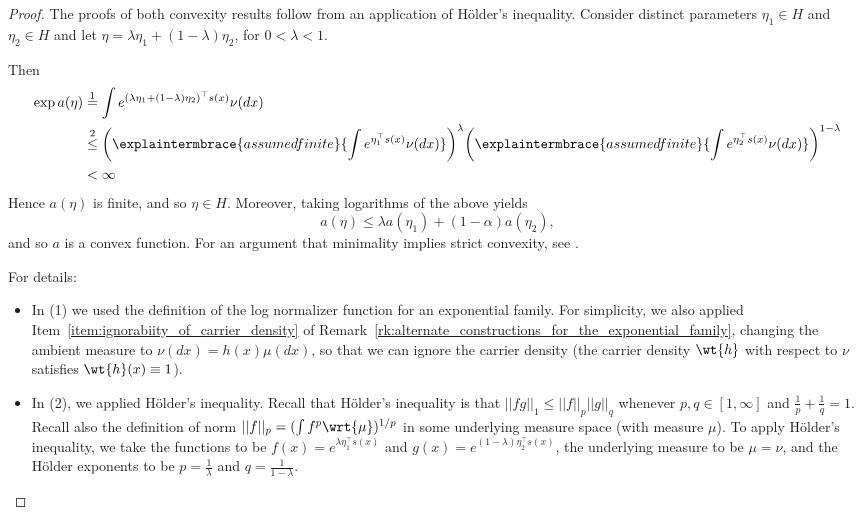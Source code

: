\documentclass{article} %
\newcommand{\logNormalizerFunction}{a}
\newcommand{\sufficientStatsFunction}{s}
\newcommand{\carrierDensity}{h}
\newcommand{\naturalParam}{\eta}
\newcommand{\naturalParamSpace}{H}
\begin{document}
\begin{proof}
The proofs of both convexity results follow from an application of H\"{o}lder’s inequality. Consider distinct parameters $\naturalParam_1 \in \naturalParamSpace$ and $\naturalParam_2 \in \naturalParamSpace$ and let $\naturalParam = \lambda \naturalParam_1 + (1-\lambda) \naturalParam_2$, for $0 < \lambda < 1$.  

Then
%
\begin{align*}
\exp \logNormalizerFunction(\naturalParam) & \stackrel{1}{=} \int e^{(\lambda \naturalParam_1 + (1-\lambda) \naturalParam_2)^\top \sufficientStatsFunction(x)}  \nu(dx)  \\
& \stackrel{2}{\leq} \bigg( \explaintermbrace{assumed finite}{\int e^{\naturalParam_1^\top \sufficientStatsFunction(x)}  \nu(dx)} \bigg)^\lambda \bigg(  \explaintermbrace{assumed finite}{\int e^{\naturalParam_2^\top \sufficientStatsFunction(x)}  \nu(dx)} \bigg)^{1-\lambda} \\
& < \infty  
\end{align*}
%
Hence $\logNormalizerFunction(\naturalParam)$ is finite, and so $\naturalParam \in \naturalParamSpace$.   Moreover, taking logarithms of the above yields
%
\[\logNormalizerFunction(\naturalParam) \leq \lambda \logNormalizerFunction(\naturalParam_1) + (1-\alpha) \logNormalizerFunction(\naturalParam_2), \]
%
and so $\logNormalizerFunction$ is a convex function.   For an argument that minimality implies strict convexity, see \citet{jordan2010exponential}.

For details:
\begin{itemize}
	\item In (1) we used the definition of the log normalizer function for an exponential family. For simplicity, we also applied Item~\ref{item:ignorabiity_of_carrier_density} of Remark~\ref{rk:alternate_constructions_for_the_exponential_family}, changing the ambient measure to $\nu(dx) = h(x) \mu(dx)$, so that we can ignore the carrier density (the carrier density $\wt{\carrierDensity}$ with respect to $\nu$ satisfies $\wt{\carrierDensity}(x) \equiv 1$).
	\item In (2), we applied H\"{o}lder’s inequality.  Recall that H\"{o}lder’s inequality is that $||fg||_1 \leq ||f||_p ||g||_q$ whenever $p,q \in [1,\infty]$ and $\frac{1}{p} + \frac{1}{q}=1$.  Recall also the definition of norm $||f||_p = (\int f^p \wrt{\mu})^{1/p}$ in some underlying measure space (with measure $\mu$).  To apply H\"{o}lder’s inequality, we take the functions to be $f(x) = e^{\lambda \naturalParam_1^\top \sufficientStatsFunction(x)}$ and $g(x) = e^{(1-\lambda)\naturalParam_2^\top \sufficientStatsFunction(x)}$, the underlying measure to be $\mu=\nu$, and the H\"{o}lder exponents to be $p=\frac{1}{\lambda}$ and $q=\frac{1}{1-\lambda}$. 
\end{itemize} 
\end{proof}
\end{document}
